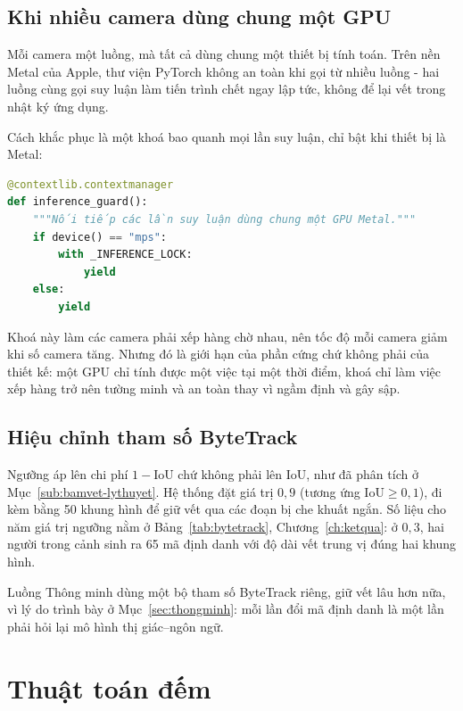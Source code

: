 \subsection{Khi nhiều camera dùng chung một GPU}
\label{sec:khoagpu}

Mỗi camera một luồng, mà tất cả dùng chung một thiết bị tính toán. Trên nền Metal của
Apple, thư viện PyTorch không an toàn khi gọi từ nhiều luồng - hai luồng cùng
gọi suy luận làm tiến trình chết ngay lập tức, không để lại vết trong nhật ký ứng dụng.

Cách khắc phục là một khoá bao quanh mọi lần suy luận, chỉ bật khi thiết bị là Metal:

\begin{lstlisting}[language=Python, caption={Nối tiếp suy luận, trích từ \code{app/config.py}}]
@contextlib.contextmanager
def inference_guard():
    """Nối tiếp các lần suy luận dùng chung một GPU Metal."""
    if device() == "mps":
        with _INFERENCE_LOCK:
            yield
    else:
        yield
\end{lstlisting}

Khoá này làm các camera phải xếp hàng chờ nhau, nên tốc độ mỗi camera giảm khi số camera
tăng. Nhưng đó là giới hạn của phần cứng chứ không phải của thiết kế: một GPU chỉ tính
được một việc tại một thời điểm, khoá chỉ làm việc xếp hàng trở nên tường minh và an
toàn thay vì ngầm định và gây sập.

\subsection{Hiệu chỉnh tham số ByteTrack}
\label{sec:bytetrack}

Ngưỡng  áp lên chi phí $1 - \mathrm{IoU}$ chứ không
phải lên IoU, như đã phân tích ở Mục~\ref{sub:bamvet-lythuyet}. Hệ thống đặt giá trị
$0{,}9$ (tương ứng $\mathrm{IoU} \geq 0{,}1$), đi kèm  bằng
50 khung hình để giữ vết qua các đoạn bị che khuất ngắn. Số liệu cho năm giá trị ngưỡng
nằm ở Bảng~\ref{tab:bytetrack}, Chương~\ref{ch:ketqua}: ở $0{,}3$, hai người trong cảnh
sinh ra 65 mã định danh với độ dài vết trung vị đúng hai khung hình.

Luồng Thông minh dùng một bộ tham số ByteTrack riêng, giữ vết lâu hơn nữa, vì lý do
trình bày ở Mục~\ref{sec:thongminh}: mỗi lần đổi mã định danh là một lần phải hỏi lại
mô hình thị giác--ngôn ngữ.

\section{Thuật toán đếm}
\label{sec:dem}

